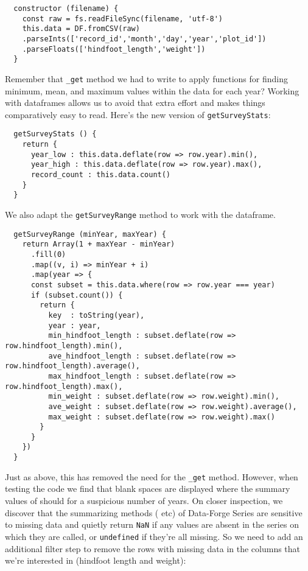 \begin{verbatim}
  constructor (filename) {
    const raw = fs.readFileSync(filename, 'utf-8')
    this.data = DF.fromCSV(raw)
    .parseInts(['record_id','month','day','year','plot_id'])
    .parseFloats(['hindfoot_length','weight'])
  }
\end{verbatim}

Remember that \texttt{_get} method we had to write
to apply functions for finding minimum, mean, and maximum
values within the data for each year?
Working with dataframes allows us to avoid that extra effort
and makes things comparatively easy to read.
Here's the new version of \texttt{getSurveyStats}:

\begin{verbatim}
  getSurveyStats () {
    return {
      year_low : this.data.deflate(row => row.year).min(),
      year_high : this.data.deflate(row => row.year).max(),
      record_count : this.data.count()
    }
  }
\end{verbatim}

We also adapt the \texttt{getSurveyRange} method
to work with the dataframe.

\begin{verbatim}
  getSurveyRange (minYear, maxYear) {
    return Array(1 + maxYear - minYear)
      .fill(0)
      .map((v, i) => minYear + i)
      .map(year => {
      const subset = this.data.where(row => row.year === year)
      if (subset.count()) {
        return {
          key  : toString(year),
          year : year,
          min_hindfoot_length : subset.deflate(row => row.hindfoot_length).min(),
          ave_hindfoot_length : subset.deflate(row => row.hindfoot_length).average(),
          max_hindfoot_length : subset.deflate(row => row.hindfoot_length).max(),
          min_weight : subset.deflate(row => row.weight).min(),
          ave_weight : subset.deflate(row => row.weight).average(),
          max_weight : subset.deflate(row => row.weight).max()
        }
      }
    })
  }
\end{verbatim}

Just as above,
this has removed the need for the \texttt{_get} method.
However, when testing the code we find
that blank spaces are displayed where
the summary values of should for a suspicious number of years.
On closer inspection,
we discover that the summarizing methods
( etc)
of Data-Forge Series are sensitive to missing data
and quietly return \texttt{NaN}
if any values are absent in the series
on which they are called,
or \texttt{undefined} if they're all missing.
So we need to add an additional filter step
to remove the rows with missing data in the columns
that we're interested in (hindfoot length and weight):

